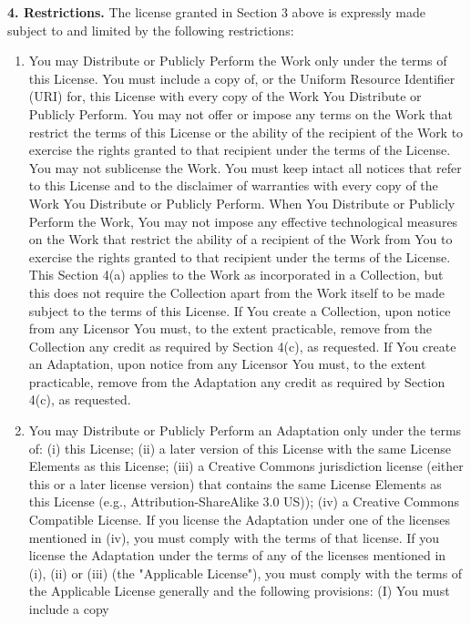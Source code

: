 \textbf{4. Restrictions.} The license granted in Section 3 above is
expressly made subject to and limited by the following
restrictions:

\begin{enumerate}
\item
  You may Distribute or Publicly Perform the Work only under the
  terms of this License. You must include a copy of, or the Uniform
  Resource Identifier (URI) for, this License with every copy of the
  Work You Distribute or Publicly Perform. You may not offer or
  impose any terms on the Work that restrict the terms of this
  License or the ability of the recipient of the Work to exercise the
  rights granted to that recipient under the terms of the License.
  You may not sublicense the Work. You must keep intact all notices
  that refer to this License and to the disclaimer of warranties with
  every copy of the Work You Distribute or Publicly Perform. When You
  Distribute or Publicly Perform the Work, You may not impose any
  effective technological measures on the Work that restrict the
  ability of a recipient of the Work from You to exercise the rights
  granted to that recipient under the terms of the License. This
  Section 4(a) applies to the Work as incorporated in a Collection,
  but this does not require the Collection apart from the Work itself
  to be made subject to the terms of this License. If You create a
  Collection, upon notice from any Licensor You must, to the extent
  practicable, remove from the Collection any credit as required by
  Section 4(c), as requested. If You create an Adaptation, upon
  notice from any Licensor You must, to the extent practicable,
  remove from the Adaptation any credit as required by Section 4(c),
  as requested.
\item
  You may Distribute or Publicly Perform an Adaptation only under the
  terms of: (i) this License; (ii) a later version of this License
  with the same License Elements as this License; (iii) a Creative
  Commons jurisdiction license (either this or a later license
  version) that contains the same License Elements as this License
  (e.g., Attribution-ShareAlike 3.0 US)); (iv) a Creative Commons
  Compatible License. If you license the Adaptation under one of the
  licenses mentioned in (iv), you must comply with the terms of that
  license. If you license the Adaptation under the terms of any of
  the licenses mentioned in (i), (ii) or (iii) (the "Applicable
  License"), you must comply with the terms of the Applicable License
  generally and the following provisions: (I) You must include a copy

\end{enumerate}
